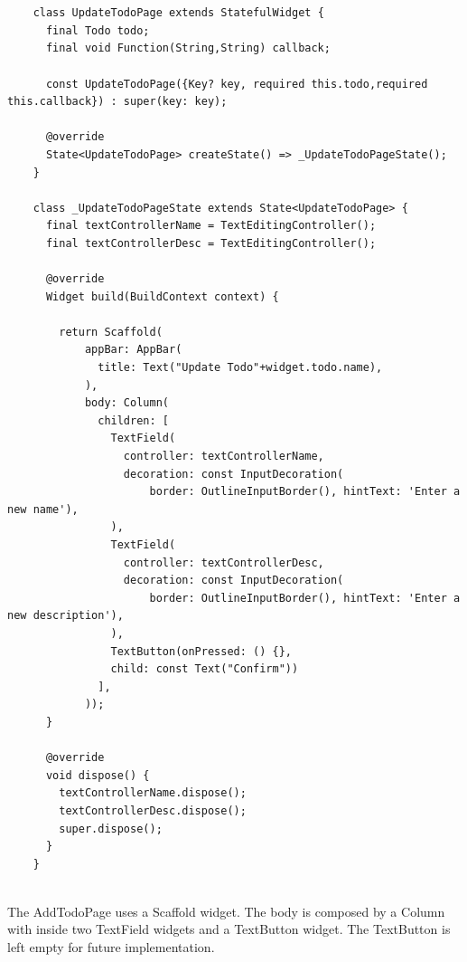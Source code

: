	\mbox{}\\
	
	 \mbox{}
	\begin{verbatim}
	
	class UpdateTodoPage extends StatefulWidget {
	  final Todo todo;
	  final void Function(String,String) callback;
	
	  const UpdateTodoPage({Key? key, required this.todo,required this.callback}) : super(key: key);
	
	  @override
	  State<UpdateTodoPage> createState() => _UpdateTodoPageState();
	}
	
	class _UpdateTodoPageState extends State<UpdateTodoPage> {
	  final textControllerName = TextEditingController();
	  final textControllerDesc = TextEditingController();
	
	  @override
	  Widget build(BuildContext context) {
	
	    return Scaffold(
	        appBar: AppBar(
	          title: Text("Update Todo"+widget.todo.name),
	        ),
	        body: Column(
	          children: [
	            TextField(
	              controller: textControllerName,
	              decoration: const InputDecoration(
	                  border: OutlineInputBorder(), hintText: 'Enter a new name'),
	            ),
	            TextField(
	              controller: textControllerDesc,
	              decoration: const InputDecoration(
	                  border: OutlineInputBorder(), hintText: 'Enter a new description'),
	            ),
	            TextButton(onPressed: () {},
	            child: const Text("Confirm"))
	          ],
	        ));
	  }
	
	  @override
	  void dispose() {
	    textControllerName.dispose();
	    textControllerDesc.dispose();
	    super.dispose();
	  }
	}
	
	\end{verbatim}
	
	\mbox{}
	
	
	
	The AddTodoPage uses a Scaffold widget. The body is composed by a Column with inside two TextField widgets and a TextButton widget. The TextButton is left empty for future implementation.
	
	\mbox{}\\
	
